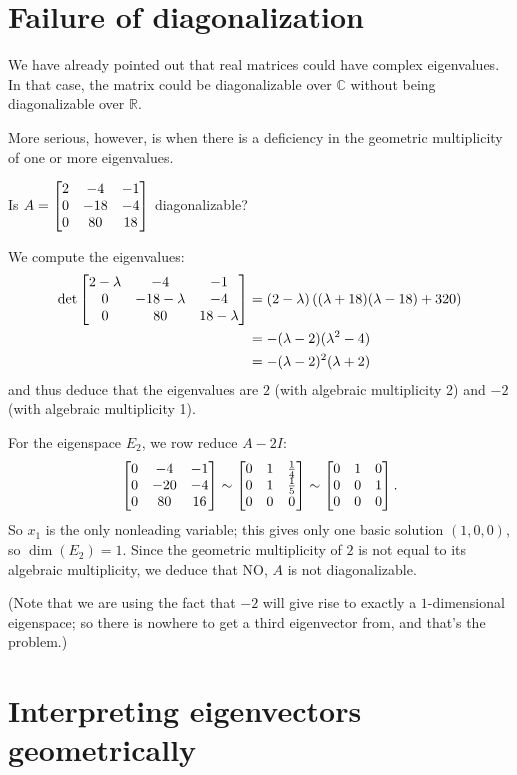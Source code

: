 \section{Failure of diagonalization}

We have already pointed out that real matrices could have complex
eigenvalues.  In that case, the matrix could be diagonalizable over
$\mathbb{C}$ without being diagonalizable over $\mathbb{R}$.

More serious, however, is when there is a deficiency in the
geometric multiplicity of one or more eigenvalues.

\begin{myexample} Is $A = \left[ \begin{matrix} 2& - 4& -1 \\ 0 & -18 & -4 \\ 0 & 80 & 18 \end{matrix} \right]$
diagonalizable?

We compute the eigenvalues:
\begin{align*}
\det\left[ \begin{matrix} 2-\lambda & -4 & -1\\ 0 & -18-\lambda  & -4\\ 0 & 80 & 18-\lambda \end{matrix} \right]
&= (2-\lambda ) \left( (\lambda + 18)(\lambda - 18) +320\right) \\
&= -(\lambda - 2)(\lambda^2 -4)\\
&= -(\lambda - 2)^2(\lambda + 2)
\end{align*}
and thus deduce that the eigenvalues are $2$ (with algebraic multiplicity 2)
and $-2$ (with algebraic multiplicity 1).

For the eigenspace $E_2$, we row reduce $A-2I$:
$$
\left[ \begin{matrix} 0 & -4 & -1\\ 0 & -20 & -4\\ 0 & 80 & 16 \end{matrix} \right]
\sim 
\left[ \begin{matrix} 0 & 1 & \frac14\\ 0 & 1 & \frac15 \\ 0 & 0 & 0 \end{matrix} \right]
\sim
\left[ \begin{matrix} 0 & 1 & 0 \\ 0 & 0 & 1\\ 0& 0 &0 \end{matrix} \right].
$$
So $x_1$ is the only nonleading variable; this gives only one basic 
solution $(1,0,0)$, so $\dim(E_2) = 1$.  Since the geometric
multiplicity of $2$ is not equal to its algebraic multiplicity,
we deduce that NO, $A$ is not diagonalizable. 

(Note that we are using the fact that $-2$ will give rise to
exactly a $1$-dimensional eigenspace; so there is nowhere to
get a third eigenvector from, and that's the problem.)
\end{myexample}


\section{Interpreting eigenvectors geometrically}


